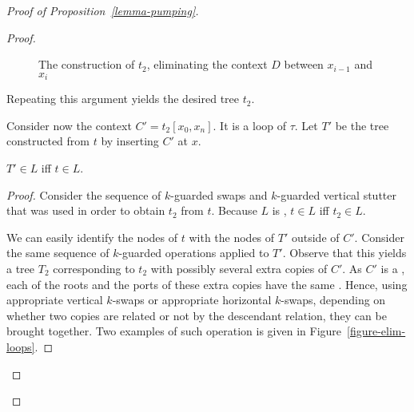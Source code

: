 \begin{proof}[Proof of Proposition~\ref{lemma-pumping}]
\begin{proof}
\begin{figure}
\begin{center}
\end{center}
\caption{The construction of $t_2$, eliminating the context $D$ between
  $x_{i-1}$ and $x_i$}\label{figure-construct-t2}
\end{figure}

 Repeating this argument yields the desired
  tree $t_2$.
 
Consider now the context $C'=t_2[x_0,x_n]$. It is a loop of \ktype $\tau$. Let
$T'$ be the tree constructed from $t$ by inserting $C'$ at $x$. 

\begin{claim} \label{claim-reverse-swaps}
$T' \in L$ iff $t\in L$.
\end{claim}

\begin{proof}
  Consider the sequence of $k$-guarded swaps and $k$-guarded vertical stutter
  that was used in order to obtain $t_2$ from $t$. Because $L$ is \ktame, $t
  \in L$ iff $t_2 \in L$.

  We can easily identify the nodes of $t$ with the nodes of $T'$ outside of
  $C'$. Consider the same sequence of $k$-guarded operations applied to $T'$.
  Observe that this yields a tree $T_2$ corresponding to $t_2$ with possibly several
  extra copies of $C'$. As $C'$ is a \kloop, each of the roots and the ports of these
  extra copies have the same \ktype. Hence, using appropriate vertical $k$-swaps or
  appropriate horizontal $k$-swaps, depending on whether two copies are related or
  not by the descendant relation, they can be brought together. Two examples of
  such operation is given in Figure~\ref{figure-elim-loops}.






\end{proof}
\end{proof}
\end{proof}
